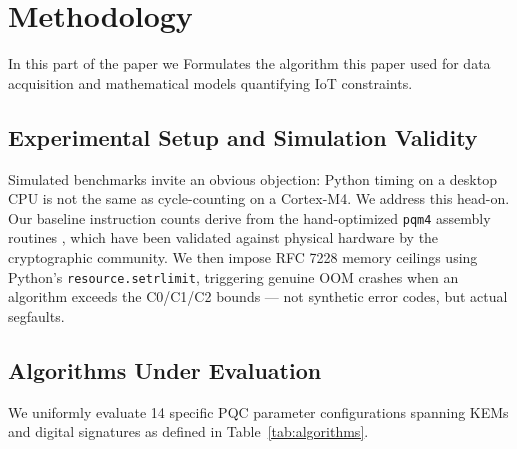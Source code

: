 \section{Methodology}
\label{sec:methodology}

In this part of the paper we Formulates the algorithm this paper used for data acquisition and mathematical models quantifying IoT constraints.

\subsection{Experimental Setup and Simulation Validity}

Simulated benchmarks invite an obvious objection: Python timing on a desktop CPU is not the same as cycle-counting on a Cortex-M4. We address this head-on. Our baseline instruction counts derive from the hand-optimized \texttt{pqm4} assembly routines \cite{kannwischer2019pqm4}, which have been validated against physical hardware by the cryptographic community. We then impose RFC 7228 memory ceilings using Python's \texttt{resource.setrlimit}, triggering genuine OOM crashes when an algorithm exceeds the C0/C1/C2 bounds — not synthetic error codes, but actual segfaults.

\subsection{Algorithms Under Evaluation}

We uniformly evaluate 14 specific PQC parameter configurations spanning KEMs and digital signatures as defined in Table~\ref{tab:algorithms}.

